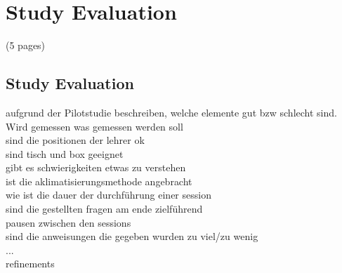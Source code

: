 \chapter{Study Evaluation}
(5 pages)
\section{Study Evaluation}
aufgrund der Pilotstudie beschreiben, welche elemente gut bzw schlecht sind.\\
Wird gemessen was gemessen werden soll\\
sind die positionen der lehrer ok\\
sind tisch und box geeignet\\
gibt es schwierigkeiten etwas zu verstehen\\
ist die aklimatisierungsmethode angebracht\\
wie ist die dauer der durchführung einer session\\
sind die gestellten fragen am ende zielführend\\
pausen zwischen den sessions\\
sind die anweisungen die gegeben wurden zu viel/zu wenig\\
...\\
refinements\\